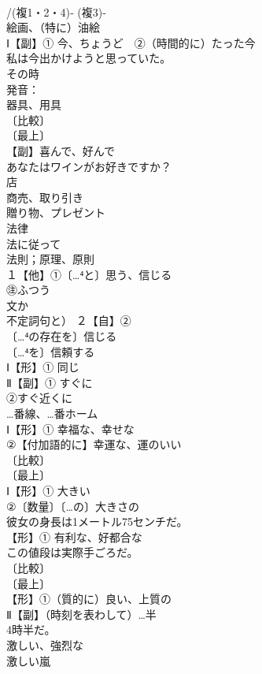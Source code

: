 \documentclass[8pt]{extreport}
\begin{document}
\begin{CJK}{UTF8}{min}
\\	/(複1・2・4)‐ (複3)‐
\\	絵画、（特に）油絵
\\	Ⅰ【副】① 今、ちょうど　②（時間的に）たった今 
\\	私は今出かけようと思っていた。 
\\	その時 
\\	発音：
\\	器具、用具
\\	〔比較〕
\\	〔最上〕
\\	【副】喜んで、好んで 
\\	あなたはワインがお好きですか？
\\	店　
\\	商売、取り引き 
\\	贈り物、プレゼント
\\	法律 
\\	法に従って 
\\	法則；原理、原則
\\	１【他】①〔…⁴と〕思う、信じる
\\	㊟ふつう
\\	文か
\\	不定詞句と） ２【自】②
\\	〔…⁴の存在を〕信じる　
\\	〔…⁴を〕信頼する 
\\	Ⅰ【形】① 同じ 
\\	Ⅱ【副】① すぐに 
\\	②すぐ近くに
\\	…番線、…番ホーム
\\	Ⅰ【形】① 幸福な、幸せな
\\	②【付加語的に】幸運な、運のいい
\\	〔比較〕
\\	〔最上〕
\\	Ⅰ【形】① 大きい
\\	②〔数量〕〔…の〕大きさの 
\\	彼女の身長は1メートル75センチだ。
\\	【形】① 有利な、好都合な
\\	この値段は実際手ごろだ。 
\\	〔比較〕
\\	〔最上〕
\\	【形】①（質的に）良い、上質の 
\\	Ⅱ【副】（時刻を表わして）…半 
\\	4時半だ。
\\	激しい、強烈な 
\\	激しい嵐

\end{CJK}
\end{document}
